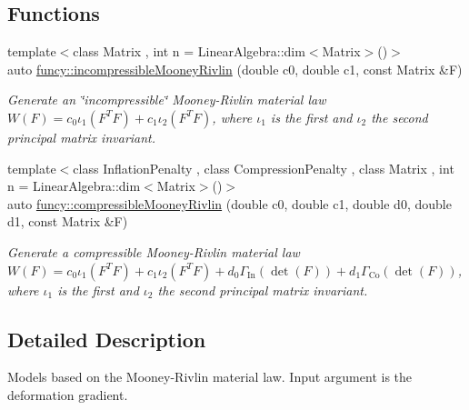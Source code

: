 \subsection*{Functions}
\begin{DoxyCompactItemize}
\item 
{\footnotesize template$<$class Matrix , int n = Linear\-Algebra\-::dim$<$\-Matrix$>$()$>$ }\\auto \hyperlink{group__Rubber_gacbf67f93c8dc330013448669410822f3}{funcy\-::incompressible\-Mooney\-Rivlin} (double c0, double c1, const Matrix \&F)
\begin{DoxyCompactList}\small\item\em Generate an \char`\"{}incompressible\char`\"{} Mooney-\/\-Rivlin material law $ W(F)=c_0\iota_1(F^T F) + c_1\iota_2(F^T F) $, where $\iota_1$ is the first and $\iota_2$ the second principal matrix invariant. \end{DoxyCompactList}\item 
{\footnotesize template$<$class Inflation\-Penalty , class Compression\-Penalty , class Matrix , int n = Linear\-Algebra\-::dim$<$\-Matrix$>$()$>$ }\\auto \hyperlink{group__Rubber_ga335b92acb5e3b72e760fe5a3d536e276}{funcy\-::compressible\-Mooney\-Rivlin} (double c0, double c1, double d0, double d1, const Matrix \&F)
\begin{DoxyCompactList}\small\item\em Generate a compressible Mooney-\/\-Rivlin material law $ W(F)=c_0\iota_1(F^T F) + c_1\iota_2(F^T F) + d_0\Gamma_\mathrm{In}(\det(F))+d_1\Gamma_\mathrm{Co}(\det(F)) $, where $\iota_1$ is the first and $\iota_2$ the second principal matrix invariant. \end{DoxyCompactList}\end{DoxyCompactItemize}


\subsection{Detailed Description}
Models based on the Mooney-\/\-Rivlin material law. Input argument is the deformation gradient. 